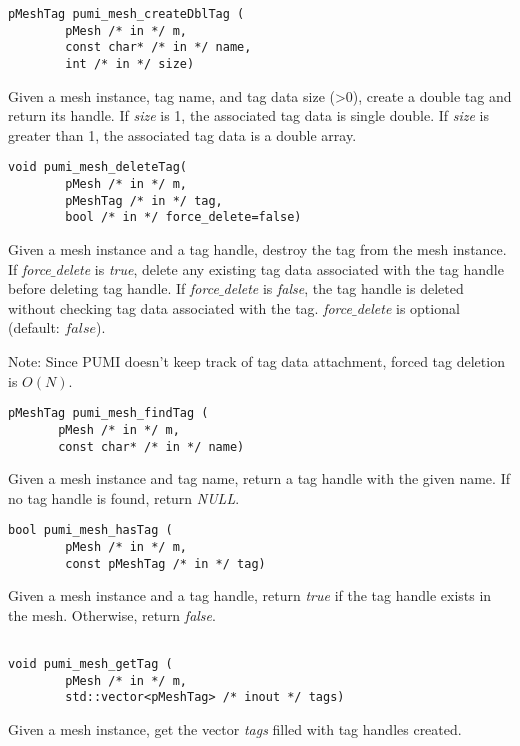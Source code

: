 \begin{verbatim}
pMeshTag pumi_mesh_createDblTag (
        pMesh /* in */ m,
        const char* /* in */ name, 
        int /* in */ size)
\end{verbatim}\vspace{-.5cm}\hspace{1cm}
Given a mesh instance, tag name, and tag data size (>0), create a double tag and return its handle.
If \emph{size} is 1, the associated tag data is single double. If \emph{size} is greater than 1, the associated tag data is a double array.

\begin{verbatim}
void pumi_mesh_deleteTag(
        pMesh /* in */ m, 
        pMeshTag /* in */ tag, 
        bool /* in */ force_delete=false)
\end{verbatim}\vspace{-.5cm}\hspace{1cm}
       Given a mesh instance and a tag handle, destroy the tag from the mesh instance. If \emph{force$\_$delete} is \emph{true}, delete any existing tag data associated with the tag handle before deleting tag handle. If \emph{force$\_$delete} is \emph{false}, the tag handle is deleted without checking tag data associated with the tag. \emph{force$\_$delete} is optional (default: $false$).

Note: Since PUMI doesn't keep track of tag data attachment, forced tag deletion is $O(N)$.

\begin{verbatim}
pMeshTag pumi_mesh_findTag (
       pMesh /* in */ m, 
       const char* /* in */ name)
\end{verbatim}\vspace{-.5cm}\hspace{1cm}
Given a mesh instance and tag name, return a tag handle with the given name. If no tag handle is found, return \emph{NULL}.

\begin{verbatim}
bool pumi_mesh_hasTag (
        pMesh /* in */ m, 
        const pMeshTag /* in */ tag)
\end{verbatim}\vspace{-.5cm}\hspace{1cm}
Given a mesh instance and a tag handle, return \emph{true} if the tag handle exists in the mesh. Otherwise, return \emph{false}.
\begin{verbatim}

void pumi_mesh_getTag (
        pMesh /* in */ m, 
        std::vector<pMeshTag> /* inout */ tags)
\end{verbatim}\vspace{-.5cm}\hspace{1cm}
Given a mesh instance, get the vector \emph{tags} filled with tag handles created.


